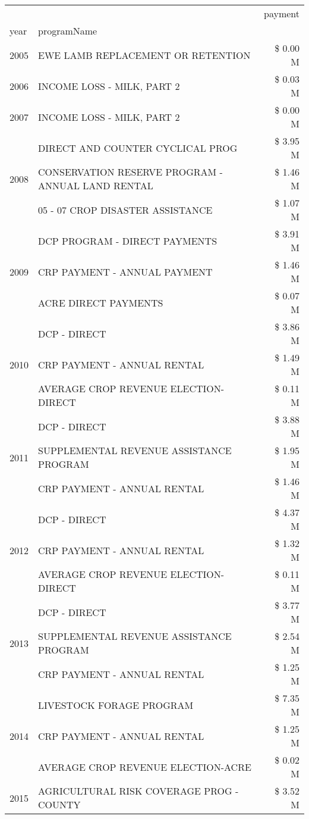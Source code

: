 \begin{tabular}{llr}
\toprule
 &  & payment \\
year & programName &  \\
\midrule
2005 & EWE LAMB REPLACEMENT OR RETENTION & \$ 0.00 M \\
\cline{1-3}
2006 & INCOME LOSS - MILK, PART 2 & \$ 0.03 M \\
\cline{1-3}
2007 & INCOME LOSS - MILK, PART 2 & \$ 0.00 M \\
\cline{1-3}
\multirow[t]{3}{*}{2008} & DIRECT AND COUNTER CYCLICAL PROG & \$ 3.95 M \\
 & CONSERVATION RESERVE PROGRAM - ANNUAL LAND RENTAL & \$ 1.46 M \\
 & 05 - 07 CROP DISASTER ASSISTANCE & \$ 1.07 M \\
\cline{1-3}
\multirow[t]{3}{*}{2009} & DCP PROGRAM - DIRECT PAYMENTS & \$ 3.91 M \\
 & CRP PAYMENT - ANNUAL PAYMENT & \$ 1.46 M \\
 & ACRE DIRECT PAYMENTS & \$ 0.07 M \\
\cline{1-3}
\multirow[t]{3}{*}{2010} & DCP - DIRECT & \$ 3.86 M \\
 & CRP PAYMENT - ANNUAL RENTAL & \$ 1.49 M \\
 & AVERAGE CROP REVENUE ELECTION-DIRECT & \$ 0.11 M \\
\cline{1-3}
\multirow[t]{3}{*}{2011} & DCP - DIRECT & \$ 3.88 M \\
 & SUPPLEMENTAL REVENUE ASSISTANCE PROGRAM & \$ 1.95 M \\
 & CRP PAYMENT - ANNUAL RENTAL & \$ 1.46 M \\
\cline{1-3}
\multirow[t]{3}{*}{2012} & DCP - DIRECT & \$ 4.37 M \\
 & CRP PAYMENT - ANNUAL RENTAL & \$ 1.32 M \\
 & AVERAGE CROP REVENUE ELECTION-DIRECT & \$ 0.11 M \\
\cline{1-3}
\multirow[t]{3}{*}{2013} & DCP - DIRECT & \$ 3.77 M \\
 & SUPPLEMENTAL REVENUE ASSISTANCE PROGRAM & \$ 2.54 M \\
 & CRP PAYMENT - ANNUAL RENTAL & \$ 1.25 M \\
\cline{1-3}
\multirow[t]{3}{*}{2014} & LIVESTOCK FORAGE PROGRAM & \$ 7.35 M \\
 & CRP PAYMENT - ANNUAL RENTAL & \$ 1.25 M \\
 & AVERAGE CROP REVENUE ELECTION-ACRE & \$ 0.02 M \\
\cline{1-3}
\multirow[t]{3}{*}{2015} & AGRICULTURAL RISK COVERAGE PROG - COUNTY & \$ 3.52 M \\

\end{tabular}
